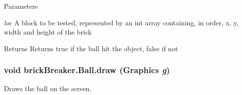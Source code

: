 \begin{DoxyParams}{Parameters}
\item[{\em loc}]A block to be tested, represented by an int array containing, in order, x, y, width and height of the brick \end{DoxyParams}
\begin{DoxyReturn}{Returns}
Returns true if the ball hit the object, false if not 
\end{DoxyReturn}
\hypertarget{classbrick_breaker_1_1_ball_ab2ed912dfac55974d85184840fd8be9d}{
\subsubsection[{draw}]{\setlength{\rightskip}{0pt plus 5cm}void brickBreaker.Ball.draw (Graphics {\em g})}}
\label{classbrick_breaker_1_1_ball_ab2ed912dfac55974d85184840fd8be9d}
Draws the ball on the screen.


